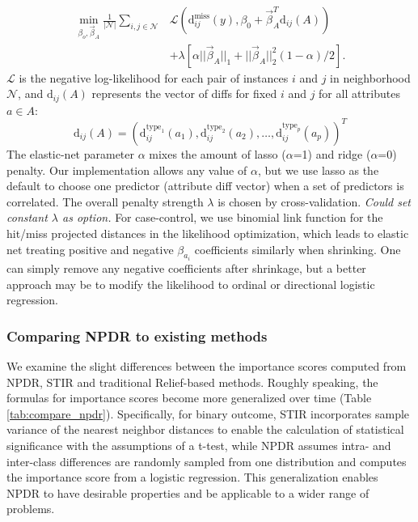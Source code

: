 \documentclass[10pt]{article}
\begin{document}
 \begin{equation}\label{eq:glmnetNPDR}
 \begin{aligned}
      \min_{\beta_o, \vec{\beta}_A} \frac{1}{|\mathcal{N}|}  \sum_{i,j \in \mathcal{N}} & 
             \mathcal{L} \left(\text{d}^{\text{miss}}_{ij}(y), \beta_0 + \vec{\beta}_A^{T} \text{d}_{ij}(A) \right)
       \\ \nonumber
       & + \lambda \left[ \alpha || \vec{\beta}_A ||_1 + || \vec{\beta}_A ||_2^2 (1-\alpha)/2  \right].
\end{aligned}
\end{equation}
$\mathcal{L}$ is the negative log-likelihood for each pair of instances $i$ and $j$ in neighborhood $\mathcal{N}$, and $\text{d}_{ij}(A)$ represents the vector of diffs for fixed $i$ and $j$ for all attributes $a \in A$: 
\begin{equation}
\text{d}_{ij}(A)= \left( \text{d}^{\text{type}_1}_{ij}(a_1), \text{d}^{\text{type}_2}_{ij}(a_2), \ldots, \text{d}^{\text{type}_p}_{ij}(a_p) \right)^{T}
\end{equation}
The elastic-net parameter $\alpha$ mixes the amount of lasso ($\alpha$=1) and ridge ($\alpha$=0) penalty. Our implementation allows any value of $\alpha$, but we use lasso as the default to choose one predictor (attribute diff vector) when a set of predictors is correlated. The overall penalty strength $\lambda$ is chosen by cross-validation.  {\it Could set constant $\lambda$ as option.} For case-control, we use binomial link function for the hit/miss projected distances in the likelihood optimization, which leads to elastic net treating positive and negative $\beta_{a_i}$ coefficients similarly when shrinking. One can simply remove any negative coefficients after shrinkage, but a better approach may be to modify the likelihood to ordinal or directional logistic regression.   

\subsubsection{Comparing NPDR to existing methods}
We examine the slight differences between the importance scores computed from NPDR, STIR and traditional Relief-based methods.
Roughly speaking, the formulas for importance scores become more generalized over time (Table \ref{tab:compare_npdr}).
Specifically, for binary outcome, STIR incorporates sample variance of the nearest neighbor distances to enable the calculation of statistical significance with the assumptions of a t-test, while NPDR assumes intra- and inter-class differences are randomly sampled from one distribution and computes the importance score from a logistic regression. This generalization enables NPDR to have desirable properties and be applicable to a wider range of problems.
\end{document}
